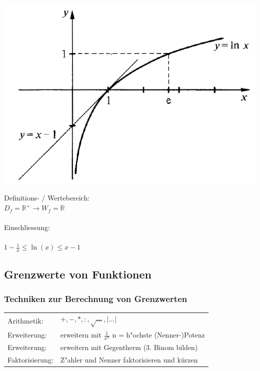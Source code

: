 			\begin{minipage}{.45\linewidth}
				\includegraphics[width=0.95\linewidth]{Bilder/ln-funktion}
			\end{minipage}
				\hfill
			\begin{minipage}{.5\linewidth}
				Definitions- / Wertebereich: \\
				$D_f = \mathbb{R^+} \rightarrow W_f = \mathbb{R}$ \\
				\\
				Einschliessung: \\
				\\
				$1-\frac{1}{x} \leq \ln(x) \leq x-1$
			\end{minipage}
				
	\subsection{Grenzwerte von Funktionen}
			
		\subsubsection{Techniken zur Berechnung von Grenzwerten}	
			\begin{tabular}{ll}
				Arithmetik: & $+, -, *, :, \sqrt{...}, \vert ...\vert$ \\
				Erweiterung:& erweitern mit $\frac{1}{x^n}$ n = h"ochste (Nenner-)Potenz \\
				Erweiterung: & erweitern mit Gegentherm (3. Binom bilden)\\
				Faktorisierung: & Z"ahler und Nenner faktorisieren und kürzen \\
			\end{tabular}
			
